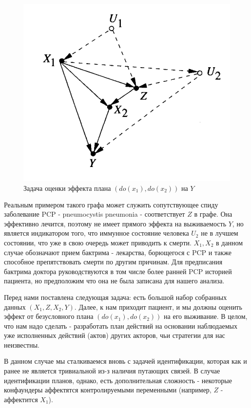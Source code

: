 \documentclass[fleqn]{article}
\numberwithin{equation}{section}
\numberwithin{theorem}{section}
\numberwithin{figure}{section}
\numberwithin{lemma}{section}
\numberwithin{corollary}{section}
\begin{document}
\begin{figure}[h]
	\begin{center}
		\includegraphics[scale=0.6]{imgs/img26.png}
	\end{center}
	\caption{Задача оценки эффекта плана $(do(x_1), do(x_2))$ на $Y$}
	\label{fig:dynamic_plan}
\end{figure}


Реальным примером такого графа может служить сопутствующее спиду заболевание PCP - pneumocystis pneumonia - соответствует $Z$ в графе. Она эффективно лечится, поэтому не имеет прямого эффекта на выживаемость $Y$, но является индикатором того, что иммунное состояние человека $U_2$ не в лучшем состоянии, что уже в свою очередь может приводить к смерти. $X_1, X_2$ в данном случае обозначают прием бактрима - лекарства, борющегося с PCP и также способное препятствовать смерти по другим причинам. Для предписания бактрима доктора руководствуются в том числе более ранней PCP историей пациента, но предположим что она не была записана для нашего анализа. 

Перед нами поставлена следующая задача: есть большой набор собранных данных $(X_1, Z, X_2, Y)$. Далее, к нам приходит пациент, и мы должны оценить эффект от безусловного плана $(do(x_1), do(x_2))$ на его выживание. В целом, что нам надо сделать - разработать план действий на основании наблюдаемых уже исполненных действий (актов) других акторов, чьи стратегии для нас неизвестны. 

В данном случае мы сталкиваемся вновь с задачей идентификации, которая как и ранее не является тривиальной из-з наличия путающих связей. В случае идентификации планов, однако, есть дополнительная сложность - некоторые конфаундеры аффектятся контролируемыми переменными (например, $Z$ - аффектится $X_1$). 
\end{document}

